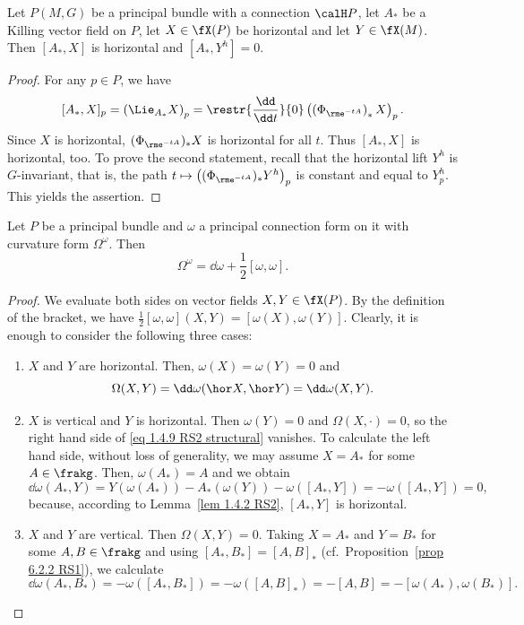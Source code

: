 \begin{lem}[{{\cite[Lem.~1.4.2]{RS2}}}]\label{lem 1.4.2 RS2}
    Let $P(M,G)$ be a principal bundle with a connection $\calH P$, let $A_\ast$ be a Killing vector field on $P$, let $X\in\fX(P)$ be horizontal and let $Y\in \fX(M)$. Then $[A_\ast,X]$ is horizontal and $[A_\ast,Y^h]=0$.
\end{lem}
\begin{proof}
    For any $p\in P$, we have
    \[[A_\ast,X]_p=\left(\Lie_{A_\ast}X\right)_p=\restr{\frac{\dd}{\dd t}}{0} \left(\left(\Phi_{\rme^{-tA}}\right)_\ast X\right)_p.\]
    Since $X$ is horizontal, $(\Phi_{\rme^{-tA}})_\ast X$ is horizontal for all $t$. Thus $[A_\ast,X]$ is horizontal, too. To prove the second statement, recall that the horizontal lift $Y^h$ is $G$-invariant, that is, the path $t\mapsto \left((\Phi_{\rme^{-tA}})_\ast Y^h\right)_p$ is constant and equal to $Y^h_p$. This yields the assertion.
\end{proof}


\begin{prop}
    Let $P$ be a principal bundle and $\omega$ a principal connection form on it with curvature form $\Omega^\omega$. Then
    \[\Omega^\omega=\dd\omega+\frac12[\omega,\omega].\label{eq 1.4.9 RS2 structural}\]
\end{prop}
\begin{proof}
    We evaluate both sides on vector fields $X,Y\in\fX(P)$. By the definition of the bracket, we have $\frac12[\omega,\omega](X,Y)=[\omega(X),\omega(Y)]$. Clearly, it is enough to consider the following three cases:
    \begin{enumerate}
        \item $X$ and $Y$ are horizontal. Then, $\omega(X)=\omega(Y)=0$ and
        \[\Omega(X,Y)=\dd\omega(\hor X,\hor Y)=\dd\omega(X,Y).\]
        
        \item $X$ is vertical and $Y$ is horizontal. Then $\omega(Y)=0$ and $\Omega(X,\cdot)=0$, so the right hand side of \eqref{eq 1.4.9 RS2 structural} vanishes. To calculate the left hand side, without loss of generality, we may assume $X=A_\ast$ for some $A\in\frakg$. Then, $\omega(A_\ast)=A$ and we obtain
        \[\dd\omega(A_\ast,Y)=Y(\omega(A_\ast))-A_\ast(\omega(Y))-\omega([A_\ast,Y])=-\omega([A_\ast,Y])=0,\]
        because, according to Lemma~\ref{lem 1.4.2 RS2}, $[A_\ast,Y]$ is horizontal.

        \item $X$ and $Y$ are vertical. Then $\Omega(X,Y)=0$. Taking $X=A_\ast$ and $Y=B_\ast$ for some $A,B\in\frakg$ and using $[A_\ast,B_\ast]=[A,B]_\ast$ (cf.\ Proposition~\ref{prop 6.2.2 RS1}), we calculate
        \[\dd\omega(A_\ast,B_\ast)=-\omega([A_\ast,B_\ast])=-\omega([A,B]_\ast)=-[A,B]=-[\omega(A_\ast),\omega(B_\ast)].\]
    \end{enumerate}
\end{proof}



